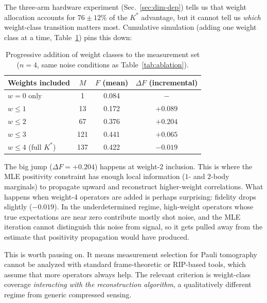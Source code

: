 \documentclass[twocolumn,prx,aps,superscriptaddress,longbibliography,floatfix]{revtex4-2}
\begin{document}
The three-arm hardware experiment (Sec.~\ref{sec:dim-dep})
tells us that weight allocation accounts for $76 \pm 12$\% of
the $K^*$ advantage, but it cannot tell us \emph{which}
weight-class transition matters most.
Cumulative simulation (adding one weight class at a time,
Table~\ref{tab:progressive}) pins this down:

\begin{table}[ht!]
\caption{Progressive addition of weight classes to the measurement
set ($n = 4$, same noise conditions as Table~\ref{tab:ablation}).}
\label{tab:progressive}
\begin{ruledtabular}
\begin{tabular}{lccc}
Weights included & $M$ & $F$ (mean) & $\Delta F$ (incremental) \\
\hline
$w = 0$ only & 1 & 0.084 & $-$ \\
$w \leq 1$ & 13 & 0.172 & $+0.089$ \\
$w \leq 2$ & 67 & $\mathbf{0.376}$ & $\mathbf{+0.204}$ \\
$w \leq 3$ & 121 & 0.441 & $+0.065$ \\
$w \leq 4$ (full $K^*$) & 137 & 0.422 & $-0.019$ \\
\end{tabular}
\end{ruledtabular}
\end{table}

The big jump ($\Delta F = +0.204$) happens at weight-2 inclusion.
This is where the MLE positivity constraint has enough local
information ($1$- and $2$-body marginals) to propagate upward
and reconstruct higher-weight correlations.
What happens when weight-4 operators are added is perhaps
surprising: fidelity drops slightly ($-0.019$).
In the underdetermined regime, high-weight operators whose
true expectations are near zero contribute mostly shot noise, and
the MLE iteration cannot distinguish this noise from
signal, so it gets pulled away from the estimate that
positivity propagation would have produced.

This is worth pausing on.
It means measurement selection for Pauli tomography
cannot be analyzed with standard frame-theoretic or RIP-based
tools, which assume that more operators always help.
The relevant criterion is weight-class coverage \emph{interacting
with the reconstruction algorithm}, a qualitatively different
regime from generic compressed sensing.


\end{document}
